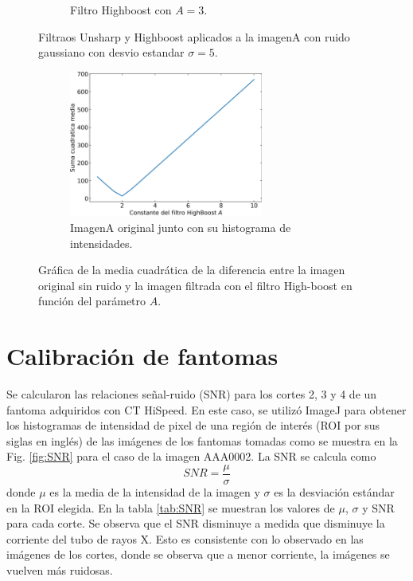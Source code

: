 \documentclass[11pt,twocolumn,twoside]{opticajnl}
\begin{document}
\begin{figure}[h]
\begin{subfigure}[h]{0.32\linewidth}
            \caption{Filtro Highboost con $A=3$.} 
         \end{subfigure}
    \caption{Filtraos Unsharp y Highboost aplicados a la imagenA con ruido gaussiano con desvio estandar $\sigma =5$.}
    \label{fig:highunsharp}
\end{figure}

\begin{figure}[h]
    \centering
         \begin{subfigure}[h]{\linewidth}
            \centering
            \includegraphics[width=0.7\textwidth]{Figuras/Highboost_plot.png}
            \caption{ImagenA original junto con su histograma de intensidades.} 
         \end{subfigure}
    \caption{Gráfica de la media cuadrática de la diferencia entre la imagen original sin ruido y la imagen filtrada con el filtro High-boost en función del parámetro $A$.}
    \label{fig:plot_highboost}
\end{figure}

\section{Calibración de fantomas\label{sec:ej7}}

\vspace{0.3cm}

Se calcularon las relaciones señal-ruido (SNR) para los cortes 2, 3 y 4 de un fantoma adquiridos con CT HiSpeed. En este caso, se utilizó ImageJ para obtener los histogramas de intensidad de pixel de una región de interés (ROI por sus siglas en inglés) de las imágenes de los fantomas tomadas como se muestra en la Fig. \ref{fig:SNR} para el caso de la imagen AAA0002. La SNR se calcula como 
\begin{equation}
    SNR = \frac{\mu}{\sigma}
\end{equation}
donde $\mu$ es la media de la intensidad de la imagen y $\sigma$ es la desviación estándar en la ROI elegida. En la tabla \ref{tab:SNR} se muestran los valores de $\mu$, $\sigma$ y SNR para cada corte. Se observa que el SNR disminuye a medida que disminuye la corriente del tubo de rayos X. Esto es consistente con lo observado en las imágenes de los cortes, donde se observa que a menor corriente, la imágenes se vuelven más ruidosas.
\end{document}
